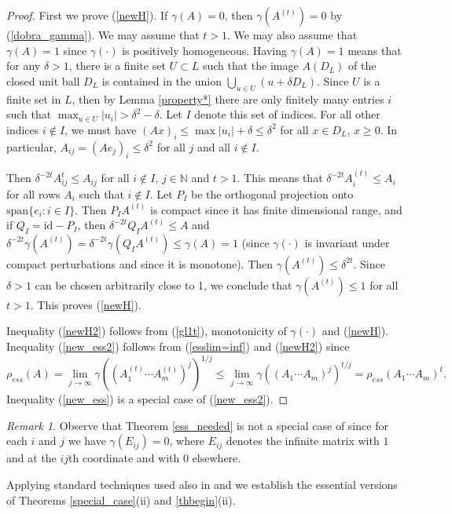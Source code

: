 \documentclass[12pt, reqno]{amsart}
\theoremstyle{definition}
\theoremstyle{remark}
\newtheorem{remark}[theorem]{Remark}
\numberwithin{equation}{section}
\begin{document}
\begin{proof}
First we prove (\ref{newH}). If $\gamma (A)=0$, then $\gamma (A^{(t)})=0$ by (\ref{dobra_gamma}).
We may assume that $t>1$. We may also assume that $\gamma (A)=1$ since $\gamma (\cdot)$ is positively homogeneous.
 Having $\gamma(A) = 1$ means that for any $\delta > 1$, there is a finite set $U \subset L$ %
such that the image $A(D_L)$ of the closed unit ball $D_L$  is contained in the union $\bigcup_{u \in U} (u+\delta D_L)$.  Since $U$ is a finite set in $L$, then by Lemma \ref{property*} %
 there are only finitely many entries $i$ such that $\max_{u \in U} |u_i| > \delta^2-\delta$. Let $I$ denote this set of indices. For all other indices $i \notin I$, we must have $(Ax)_i \le \max |u_i| + \delta \le \delta^2$ for all $x \in D_L$, $x\ge 0$.  In particular, $A_{ij} = (Ae_j)_i \le \delta^2$ for all $j$ and all $i \notin I$.

Then $\delta^{-2t} A_{ij}^t \le A_{ij}$ for all $i \notin I$, $j \in \mathbb{N}$ and $t > 1$.  This means that $\delta^{-2t} A^{(t)} _i \le A _i$ for all rows $A_i$ such that $i \notin I$. %
Let $P_I$ be the orthogonal projection onto $\mathrm{span} \{e_i : i \in I\}$.  Then $P_I A^{(t)}$ is compact since it has finite dimensional range, and if $Q_I = \mathrm{id} - P_I$, then $\delta^{-2t}Q_I A^{(t)} \le A$ and $\delta^{-2t} \gamma(A^{(t)}) =  \delta^{-2t} \gamma(Q_I A^{(t)}) \le \gamma(A) = 1$ (since $\gamma(\cdot)$ is invariant under compact perturbations and since it is monotone). Then $\gamma(A^{(t)}) \le \delta^{2t}$.  Since $\delta > 1$ can be chosen arbitrarily close to 1, we conclude that $\gamma(A^{(t)}) \le 1$ for all $t > 1$. This proves (\ref{newH}).

Inequality (\ref{newH2}) follows from (\ref{gl1t}), monotonicity of $\gamma(\cdot)$  and   (\ref{newH}). Inequality (\ref{new_ess2}) follows from (\ref{esslim=inf}) and  (\ref{newH2}) since 
$$\rho _{ess} (A) =\lim _{j \to \infty} \gamma ((A_1^{(t)}\cdots A_m^{(t)})^j)^{1/j}\le \lim _{j \to \infty} \gamma ((A_1 \cdots A_m)^j)^{t/j}=\rho_{ess} (A_1\cdots A_m)^{t}.$$
 Inequality  (\ref{new_ess}) is a special case of  (\ref{new_ess2}).
\end{proof}
\begin{remark}{\rm Observe that Theorem \ref{ess_needed} is not a special case of \cite[Lemma 4.2]{P06} since for each $i$ and $j$ we have $\gamma (E_{ij})=0$, where $E_{ij}$ denotes the infinite matrix with $1$ and at the $ij$th coordinate and with $0$ elsewhere.
}
\end{remark}
Applying standard techniques used also in \cite{DP05} and \cite{P06} we establish the essential versions of Theorems \ref{special_case}(ii) and  \ref{thbegin}(ii).%
\end{document}

